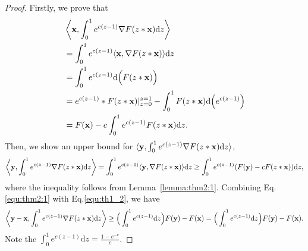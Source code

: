 		\begin{proof}
			Firstly, we prove that
			\begin{equation}\label{equ:thm2:1}
				\begin{aligned}
					&\left\langle\mathbf{x},\int_{0}^{1}e^{c(z-1)}\nabla F(z*\mathbf{x})\mathrm{d}z\right\rangle\\&=	\int_{0}^{1}e^{c(z-1)}\langle\mathbf{x},\nabla F(z*\mathbf{x})\rangle\mathrm{d}z\\
					&=\int_{0}^{1}e^{c(z-1)}\mathrm{d}\Big(F(z*\mathbf{x})\Big)\\
					&=e^{c(z-1)}*F(z*\mathbf{x})|_{z=0}^{z=1}-\int_{0}^{1}F(z*\mathbf{x})\mathrm{d}\Big(e^{c(z-1)}\Big)\\
					&=F(\mathbf{x})-c\int_{0}^{1}e^{c(z-1)}F(z*\mathbf{x})\mathrm{d}z.
					\end{aligned}
				\end{equation}
			Then, we show an upper bound for $\langle\mathbf{y},\int_{0}^{1}e^{c(z-1)}\nabla F(z*\mathbf{x})\mathrm{d}z\rangle$, 
			\begin{equation}\label{equ:th1_2}
				\left\langle\mathbf{y},\int_{0}^{1}e^{c(z-1)}\nabla F(z*\mathbf{x})\mathrm{d}z\right\rangle=\int_{0}^{1}e^{c(z-1)}\langle\mathbf{y},\nabla F(z*\mathbf{x})\rangle\mathrm{d}z\ge\int_{0}^{1}e^{c(z-1)}(F(\mathbf{y})-cF(z*\mathbf{x}))\mathrm{d}z,
				\end{equation}  where the inequality follows from Lemma~\ref{lemma:thm2:1}.
	Combining Eq.\eqref{equ:thm2:1} with Eq.\eqref{equ:th1_2}, we have 
		\begin{equation*}
			\left\langle\mathbf{y}-\mathbf{x}, \int_{0}^{1}e^{c(z-1)}\nabla F(z*\mathbf{x})\mathrm{d}z\right\rangle\ge \Big(\int_{0}^{1}e^{c(z-1)}\mathrm{d}z\Big)F(\mathbf{y})-F(\mathbf{x})=\Big(\int_{0}^{1}e^{c(z-1)}\mathrm{d}z\Big)F(\mathbf{y})-F(\mathbf{x}).
			\end{equation*}
Note the $\int_{0}^{1}e^{c(z-1)}\mathrm{d}z=\frac{1-e^{-c}}{c}$.
	\end{proof}
	
